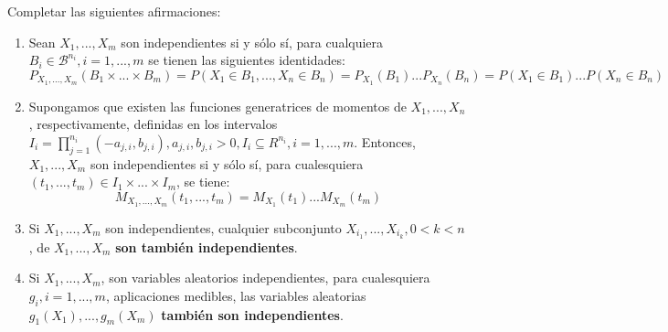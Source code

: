 \documentclass[a4paper, 12pt]{article}
\theoremstyle{plain}
\theoremstyle{definition}
\theoremstyle{remark}
\begin{document}
	Completar las siguientes afirmaciones:
	\begin{flushleft}
		\begin{enumerate}
			\item Sean $X_1,...,X_m$ son independientes si y sólo sí, para cualquiera $B_i \in \mathcal{B}^{n_i},i=1,...,m$ se tienen las siguientes identidades:
				\[
				P_{X_1,...,X_m}(B_1\times...\times B_m)=P(X_1\in B_1,...,X_n \in B_n)=P_{X_1}(B_1)...P_{X_n}(B_n)=P(X_1\in B_1)...P(X_n\in B_n)
				\]
			\item Supongamos que existen las funciones generatrices de momentos de $X_1,...,X_n$, respectivamente, definidas en los intervalos $I_i=\prod_{j=1}^{n_i}(-a_{j,i},b_{j,i}),a_{j,i},b_{j,i}>0,I_i\subseteq R^{n_i},i=1,...,m$. Entonces, $X_1,...,X_m$ son independientes si y sólo sí, para cualesquiera $(t_1,...,t_m)\in I_1\times ...\times I_m$, se tiene:
			\[
			M_{X_1,...,X_m}(t_1,...,t_m)=M_{X_1}(t_1)...M_{X_m}(t_m)
			\]
			\item Si $X_1,...,X_m$ son independientes, cualquier subconjunto $X_{i_1},...,X_{i_k},0<k<n$, de $X_1,...,X_m$ \textbf{son también independientes}.
			\item Si $X_1,...,X_m$, son variables aleatorios independientes, para cualesquiera $g_i, i=1,...,m$, aplicaciones medibles, las variables aleatorias $g_1(X_1),...,g_m(X_m)$ \textbf{también son independientes}.
		\end{enumerate}
	\end{flushleft}
\end{document}
